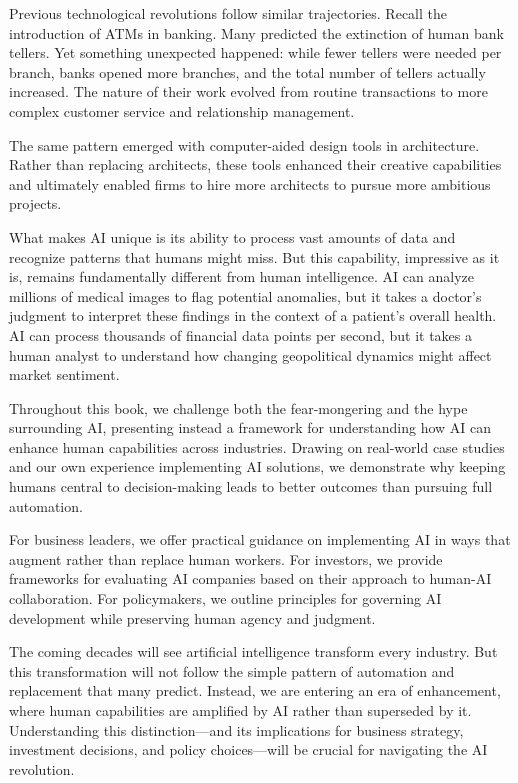 \documentclass[
  Letterpaper,
]{scrbook}
\begin{document}
Previous technological revolutions follow similar trajectories. Recall
the introduction of ATMs in banking. Many predicted the extinction of
human bank tellers. Yet something unexpected happened: while fewer
tellers were needed per branch, banks opened more branches, and the
total number of tellers actually increased. The nature of their work
evolved from routine transactions to more complex customer service and
relationship management.

The same pattern emerged with computer-aided design tools in
architecture. Rather than replacing architects, these tools enhanced
their creative capabilities and ultimately enabled firms to hire more
architects to pursue more ambitious projects.

What makes AI unique is its ability to process vast amounts of data and
recognize patterns that humans might miss. But this capability,
impressive as it is, remains fundamentally different from human
intelligence. AI can analyze millions of medical images to flag
potential anomalies, but it takes a doctor's judgment to interpret these
findings in the context of a patient's overall health. AI can process
thousands of financial data points per second, but it takes a human
analyst to understand how changing geopolitical dynamics might affect
market sentiment.

Throughout this book, we challenge both the fear-mongering and the hype
surrounding AI, presenting instead a framework for understanding how AI
can enhance human capabilities across industries. Drawing on real-world
case studies and our own experience implementing AI solutions, we
demonstrate why keeping humans central to decision-making leads to
better outcomes than pursuing full automation.

For business leaders, we offer practical guidance on implementing AI in
ways that augment rather than replace human workers. For investors, we
provide frameworks for evaluating AI companies based on their approach
to human-AI collaboration. For policymakers, we outline principles for
governing AI development while preserving human agency and judgment.

The coming decades will see artificial intelligence transform every
industry. But this transformation will not follow the simple pattern of
automation and replacement that many predict. Instead, we are entering
an era of enhancement, where human capabilities are amplified by AI
rather than superseded by it. Understanding this distinction---and its
implications for business strategy, investment decisions, and policy
choices---will be crucial for navigating the AI revolution.
\end{document}
